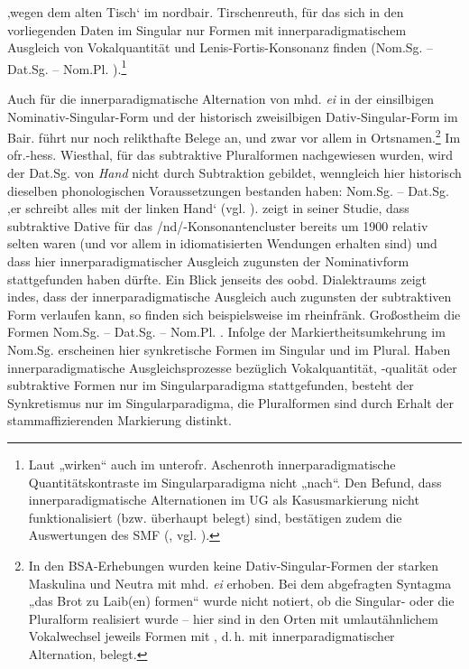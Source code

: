 \begin{sloppypar}
  ‚wegen dem alten Tisch‘ im nordbair. Tirschenreuth, für das sich in den vorliegenden Daten im Singular nur Formen mit innerparadigmatischem Ausgleich von Vokalquantität und Lenis-Fortis-Konsonanz finden (Nom.Sg.  -- Dat.Sg.   -- Nom.Pl. ).\footnote{Laut \citet[16]{Köhler1934} „wirken“ auch im unterofr. Aschenroth innerparadigmatische Quantitätskontraste im Singularparadigma nicht „nach“. Den Befund, dass innerparadigmatische Alternationen im UG als Kasusmarkierung nicht funktionalisiert (bzw. überhaupt belegt) sind, bestätigen zudem die Auswertungen des SMF (\citealt[116--117]{SMF7}, vgl. \citealt[§283]{Gebhardt1907}).}
\end{sloppypar}

Auch für die innerparadigmatische Alternation von mhd. \textit{ei} in der einsilbigen Nominativ-Singular-Form und der historisch zweisilbigen Dativ-Singular-Form im Bair. führt \citet[94--95]{Rowley1997} nur noch relikthafte Belege an, und zwar vor allem in Ortsnamen.\footnote{In den BSA-Erhebungen wurden keine Dativ-Singular-Formen der starken Maskulina und Neutra mit mhd. \textit{ei} erhoben. Bei dem abgefragten Syntagma „das Brot zu Laib(en) formen“ wurde nicht notiert, ob die Singular- oder die Pluralform realisiert wurde -- hier sind in den Orten mit umlautähnlichem Vokalwechsel jeweils Formen mit , d.\,h. mit innerparadigmatischer Alternation, belegt.} Im ofr.-hess. Wiesthal, für das subtraktive Pluralformen nachgewiesen wurden, wird der Dat.Sg. von \textit{Hand} nicht durch Subtraktion gebildet, wenngleich hier historisch dieselben phonologischen Voraussetzungen bestanden haben: Nom.Sg.  -- Dat.Sg.       ‚er schreibt alles mit der linken Hand‘ (vgl. ). \citet[63--65]{Birkenes2014} zeigt in seiner Studie, dass subtraktive Dative für das /nd/-Konsonantencluster bereits um 1900 relativ selten waren (und vor allem in idiomatisierten Wendungen erhalten sind) und dass hier innerparadigmatischer Ausgleich zugunsten der Nominativform stattgefunden haben dürfte. Ein Blick jenseits des oobd. Dialektraums zeigt indes, dass der innerparadigmatische Ausgleich auch zugunsten der subtraktiven Form verlaufen kann, so finden sich beispielsweise im rheinfränk. Großostheim die Formen Nom.Sg.   -- Dat.Sg.    -- Nom.Pl. . Infolge der Markiertheitsumkehrung im Nom.Sg. erscheinen hier synkretische Formen im Singular und im Plural. Haben innerparadigmatische Ausgleichsprozesse bezüglich Vokalquantität, -qualität oder subtraktive Formen nur im Singularparadigma stattgefunden, besteht der Synkretismus nur im Singularparadigma, die Pluralformen sind durch Erhalt der stammaffizierenden Markierung distinkt.

